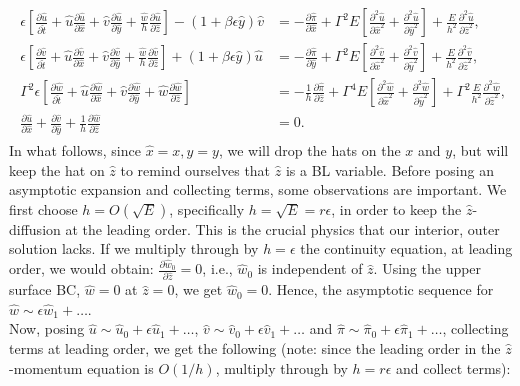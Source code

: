 \documentclass{article}
\newcommand{\pd}[2]{\frac{\partial{#1}}{\partial{#2}}}
\newcommand{\pdd}[2]{\frac{\partial^2{#1}}{\partial{#2}^2}}
\begin{document}
\begin{align}\label{eq:bl-rotating-NS-dimless}
 \begin{split}
  \epsilon \left[\pd{\hat{u} }{\hat{t} } + \hat{u} \pd{\hat{u} }{\hat{x} } + \hat{v} \pd{\hat{u} }{\hat{y} } + \frac{\hat{w}}{h}\pd{\hat{u}}{\hat{z} }\right] - (1 + \beta \epsilon \hat{y}) \hat{v} &= -\pd{\hat{\pi} }{\hat{x} } + \Gamma^{2}E\left[\pdd{\hat{u}}{\hat{x}} + \pdd{\hat{u}}{\hat{y}}\right] + \frac{E}{h^{2}} \pdd{\hat{u}}{\hat{z} },\\
  \epsilon \left[\pd{\hat{v} }{\hat{t} } + \hat{u} \pd{\hat{v} }{\hat{x} } + \hat{v} \pd{\hat{v} }{\hat{y} } + \frac{\hat{w}}{h}\pd{\hat{v}}{\hat{z} }\right] + (1 + \beta \epsilon \hat{y}) \hat{u} &= -\pd{\hat{\pi} }{\hat{y} } + \Gamma^{2}E\left[\pdd{\hat{v}}{\hat{x}} + \pdd{\hat{v}}{\hat{y}}\right] + \frac{E}{h^{2}} \pdd{\hat{v}}{\hat{z} },\\
  \Gamma^{2} \epsilon \left[\pd{\hat{w} }{\hat{t} } + \hat{u} \pd{\hat{w}}{\hat{x} } + \hat{v} \pd{\hat{w}}{\hat{y}} + \hat{w}\pd{\hat{w}}{\hat{z}} \right] &= - \frac{1}{h}\pd{\hat{\pi}}{\hat{z} } + \Gamma^{4}E\left[\pdd{\hat{w}}{\hat{x}} + \pdd{\hat{w}}{\hat{y}}\right] + \Gamma^{2}\frac{E}{h^{2}} \pdd{\hat{w}}{\hat{z}},\\
  \pd{\hat{u}}{\hat{x}} + \pd{\hat{v}}{\hat{y}} + \frac{1}{h}\pd{\hat{w}}{\hat{z}} &= 0.
 \end{split}
\end{align}
In what follows, since $\hat{x} = x, \hat{y} = y$, we will drop the hats on the $x$ and $y$, but will keep the hat on $\hat{z}$ to remind ourselves that $\hat{z}$ is a BL variable. Before posing an asymptotic expansion and collecting terms, some observations are important. We first choose $h = O(\sqrt{E})$, specifically $h = \sqrt{E} = r\epsilon$, in order to keep the $\hat{z}$-diffusion at the leading order. This is the crucial physics that our interior, outer solution lacks. If we multiply through by $h = \epsilon$ the continuity equation, at leading order, we would obtain: $\boxed{\pd {\hat{w}_{0}}{\hat{z}} = 0}$, i.e., $\hat{w}_{0}$ is independent of $\hat{z}$. Using the upper surface BC, $\hat{w} = 0$ at $\hat{z} = 0$, we get $\hat{w}_{0} = 0$. Hence, the asymptotic sequence for $\boxed{\hat{w} \sim \epsilon \hat{w}_{1} + \hdots}$. \\
%
Now, posing $\hat{u} \sim \hat{u}_{0} + \epsilon \hat{u}_{1} + \hdots$, $\hat{v} \sim \hat{v}_{0} + \epsilon \hat{v}_{1} + \hdots$ and $\hat{\pi} \sim \hat{\pi}_{0} + \epsilon \hat{\pi}_{1} + \hdots$, collecting terms at leading order, we get the following (note: since the leading order in the $\hat{z}$-momentum equation is $O(1/h)$, multiply through by $h = r\epsilon$ and collect terms):
\end{document}
